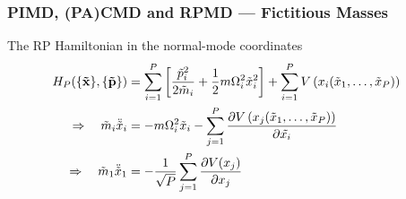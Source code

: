 \begin{frame}
  \frametitle{PIMD, (PA)CMD and RPMD --- Fictitious Masses}
  The RP Hamiltonian in the normal-mode coordinates
  \begin{align*}
    H_P(\{\mathbf{\tilde{x}}\}, \{\mathbf{\tilde{p}}\}) &=
    \sum_{i=1}^P
    \left[
      \frac{\tilde{p}_i^2}{2\tilde{m}_i}
      +
      \frac{1}{2} m \Omega_i^2 \tilde{x}_i^2
    \right]
      +
      \sum_{i=1}^P V\left(x_i(\tilde{x}_1,\ldots,\tilde{x}_P)\right) \cr
      \Rightarrow \quad
      \tilde{m}_i \ddot{\tilde{x}}_i &=
                           -m
                           \tikzmark{RPOmega}\Omega_i^2
                           \tilde{x}_i
                           - \sum_{j=1}^P
                           {
                           \partial
                           V\left(x_j(\tilde{x}_1,\ldots,\tilde{x}_P)\right)
                           \over
                           \partial
                           \tilde{x_i} \tikzmark{RPPot}
                           } \cr
      \Rightarrow \quad
      \tilde{m}_1 \ddot{\tilde{x}}_1 &=
      - {1\over\sqrt{P}} \sum_{j=1}^P {\partial V(x_j) \over \partial x_j}
  \end{align*}



\end{frame}
